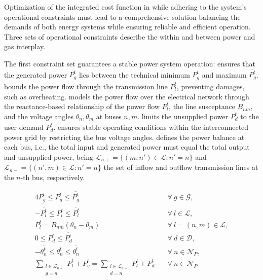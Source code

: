 Optimization of the integrated cost function in  while adhering to the system's operational constraints must lead to a comprehensive solution balancing the demands of both energy systems while ensuring reliable and efficient operation. Three sets of operational constraints describe the within and between power and gas interplay.

The first constraint set guarantees a stable power system operation:  ensures that the generated power $P_{g}^t$ lies between the technical minimum $\underline{P_g^t}$ and maximum $\overline{P_g^t}$.  bounds the power flow through the transmission line $P_{l}^t$, preventing damages, such as overheating.  models the power flow over the electrical network through the reactance-based relationship of the power flow $P_{l}^t$, the line susceptance $B_{nm}$, and the voltage angles $\theta_n,\theta_{m}$ at buses $n,m$.  limits the unsupplied power $P_{d}^t$ to the user demand $\overline{P_{d}^t}$.  ensures stable operating conditions within the interconnected power grid by restricting the bus voltage angles.  defines the power balance at each bus, i.e., the total input and generated power must equal the total output and unsupplied power, being $\mathcal{L}_{n+}=\{(m,n')\in\mathcal{L}:n'=n\}$ and $\mathcal{L}_{n-}=\{(n',m)\in\mathcal{L}:n'=n\}$ the set of inflow and outflow transmission lines at the $n$-th bus, respectively.

\begin{alignat}{4}
    \underline{P_g^t} \leq P_{g}^t \leq \overline{P_g^t} &\quad \forall \ g \in \mathcal{G}, \label{eq:gen_limits} \\
    -\overline{P_l^t} \leq P_{l}^t \leq \overline{P_l^t} &\quad \forall \ l \in \mathcal{L}, \label{eq:line_limits} \\
    P_{l}^t = B_{nm}(\theta_n - \theta_{m}) &\quad \forall \ l = (n, m) \in \mathcal{L} , \label{eq:dc_power_flow} \\
    0 \leq P_{d}^t \leq \overline{P_{d}^t} &\quad \forall \ d \in \mathcal{D}, \label{eq:dem_limit_power} \\
    -\overline{\theta_{n}^t} \leq \theta_{n}^t \leq \overline{\theta_{n}^t} &\quad \forall \ n \in \mathcal{N}_P, \label{eq:voltage_angle_limits} \\
    \sum_{\substack{l\in \mathcal{L}_{n+}\\g=n}}{P_{l}^t + P_{g}^t} = \sum_{\substack{l\in \mathcal{L}_{n-}\\d=n}} P_{l}^t + P_{d}^t &\quad \forall \ n \in \mathcal{N}_P \label{eq:power_balance} 
\end{alignat}

